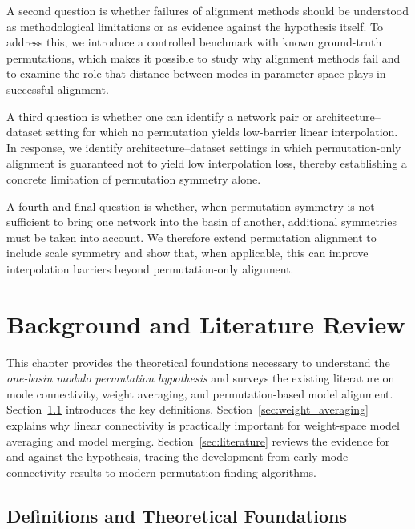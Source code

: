 \documentclass[11pt,a4paper]{report}
\begin{document}
A second question is whether failures of alignment methods should be understood as methodological limitations or as evidence against the hypothesis itself. To address this, we introduce a controlled benchmark with known ground-truth permutations, which makes it possible to study why alignment methods fail and to examine the role that distance between modes in parameter space plays in successful alignment.

A third question is whether one can identify a network pair or architecture--dataset setting for which no permutation yields low-barrier linear interpolation. In response, we identify architecture--dataset settings in which permutation-only alignment is guaranteed not to yield low interpolation loss, thereby establishing a concrete limitation of permutation symmetry alone.

A fourth and final question is whether, when permutation symmetry is not sufficient to bring one network into the basin of another, additional symmetries must be taken into account. We therefore extend permutation alignment to include scale symmetry and show that, when applicable, this can improve interpolation barriers beyond permutation-only alignment.


\chapter{Background and Literature Review}

This chapter provides the theoretical foundations necessary to understand the 
\textit{one-basin modulo permutation hypothesis} and surveys the existing 
literature on mode connectivity, weight averaging, and permutation-based model 
alignment. Section~\ref{sec:definitions} introduces the key definitions. Section~\ref{sec:weight_averaging} explains why linear connectivity is practically important for weight-space model averaging and model merging. 
Section~\ref{sec:literature} reviews the evidence for and against the hypothesis, 
tracing the development from early mode connectivity results to modern 
permutation-finding algorithms.

\section{Definitions and Theoretical Foundations}
\label{sec:definitions} 
\end{document}

